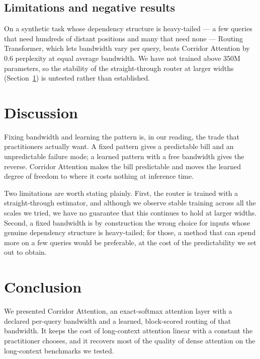 \documentclass[11pt]{article}
\begin{document}
\subsection{Limitations and negative results}\label{sec:limits}

On a synthetic task whose dependency structure is heavy-tailed --- a few
queries that need hundreds of distant positions and many that need none ---
Routing Transformer, which lets bandwidth vary per query, beats Corridor
Attention by 0.6 perplexity at equal average bandwidth. We have not trained
above 350M parameters, so the stability of the straight-through router at
larger widths (Section~\ref{sec:discussion}) is untested rather than
established.

\section{Discussion}\label{sec:discussion}

Fixing bandwidth and learning the pattern is, in our reading, the trade that
practitioners actually want. A fixed pattern gives a predictable bill and an
unpredictable failure mode; a learned pattern with a free bandwidth gives the
reverse. Corridor Attention makes the bill predictable and moves the learned
degree of freedom to where it costs nothing at inference time.

Two limitations are worth stating plainly. First, the router is trained with a
straight-through estimator, and although we observe stable training across all
the scales we tried, we have no guarantee that this continues to hold at
larger widths. Second, a fixed bandwidth is by construction the wrong choice
for inputs whose genuine dependency structure is heavy-tailed; for those, a
method that can spend more on a few queries would be preferable, at the cost of
the predictability we set out to obtain.

\section{Conclusion}\label{sec:conclusion}

We presented Corridor Attention, an exact-softmax attention layer with a
declared per-query bandwidth and a learned, block-scored routing of that
bandwidth. It keeps the cost of long-context attention linear with a constant
the practitioner chooses, and it recovers most of the quality of dense
attention on the long-context benchmarks we tested.



\end{document}
